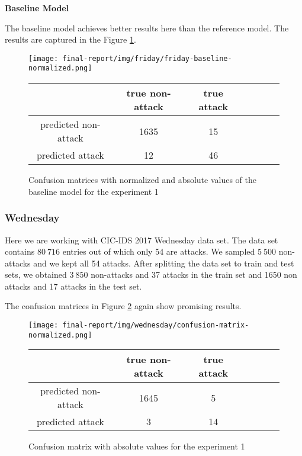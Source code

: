 \documentclass{article}
\begin{document}
\vspace{0.5cm}
\noindent\textbf{Baseline Model}

The baseline model achieves better results here than the reference model. The results are captured in the Figure \ref{fig-exp1-baseline}.

\begin{figure}[h!]
    \centering
    \texttt{[image: final-report/img/friday/friday-baseline-normalized.png]}

    \centering
    \begin{tabular}{ |c|c|c|c|c|c|c| }
     \hline
      & true non-attack & true attack \\
     \hline
     predicted non-attack & 1635 & 15 \\
     \hline
     predicted attack & 12 & 46 \\
     \hline
    \end{tabular}
    \caption{Confusion matrices with normalized and absolute values of the baseline model for the experiment 1}
    \label{fig-exp1-baseline}
\end{figure}

\clearpage



\subsubsection{Wednesday}
Here we are working with CIC-IDS 2017 Wednesday data set. The data set contains $80\ 716$ entries out of which only 54 are attacks. We sampled $5\ 500$ non-attacks and we kept all 54 attacks. After splitting the data set to train and test sets, we obtained $3\ 850$ non-attacks and 37 attacks in the train set and 1650 non attacks and 17 attacks in the test set.

The confusion matrices in Figure \ref{fig-exp2-transcriptions} again show promising results.

\begin{figure}[h!]
    \centering
    \texttt{[image: final-report/img/wednesday/confusion-matrix-normalized.png]}

    \centering
    \begin{tabular}{ |c|c|c|c|c|c|c| }
     \hline
      & true non-attack & true attack \\
     \hline
     predicted non-attack & 1645 & 5 \\
     \hline
     predicted attack & 3 & 14 \\
     \hline
    \end{tabular}
    \caption{Confusion matrix with absolute values for the experiment 1}
    \label{fig-exp2-transcriptions}
\end{figure}
\end{document}
